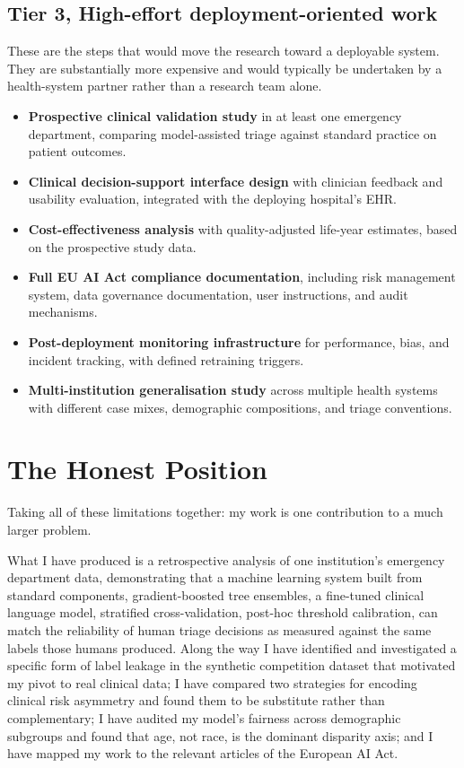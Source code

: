\subsection*{Tier 3, High-effort deployment-oriented work}

These are the steps that would move the research toward a deployable system. They are substantially more expensive and would typically be undertaken by a health-system partner rather than a research team alone.

\begin{itemize}
 \item \textbf{Prospective clinical validation study} in at least one emergency department, comparing model-assisted triage against standard practice on patient outcomes.
 \item \textbf{Clinical decision-support interface design} with clinician feedback and usability evaluation, integrated with the deploying hospital's EHR.
 \item \textbf{Cost-effectiveness analysis} with quality-adjusted life-year estimates, based on the prospective study data.
 \item \textbf{Full EU AI Act compliance documentation}, including risk management system, data governance documentation, user instructions, and audit mechanisms.
 \item \textbf{Post-deployment monitoring infrastructure} for performance, bias, and incident tracking, with defined retraining triggers.
 \item \textbf{Multi-institution generalisation study} across multiple health systems with different case mixes, demographic compositions, and triage conventions.
\end{itemize}

\section{The Honest Position}

Taking all of these limitations together: my work is one contribution to a much larger problem.

What I have produced is a retrospective analysis of one institution's emergency department data, demonstrating that a machine learning system built from standard components, gradient-boosted tree ensembles, a fine-tuned clinical language model, stratified cross-validation, post-hoc threshold calibration, can match the reliability of human triage decisions as measured against the same labels those humans produced. Along the way I have identified and investigated a specific form of label leakage in the synthetic competition dataset that motivated my pivot to real clinical data; I have compared two strategies for encoding clinical risk asymmetry and found them to be substitute rather than complementary; I have audited my model's fairness across demographic subgroups and found that age, not race, is the dominant disparity axis; and I have mapped my work to the relevant articles of the European AI Act.

